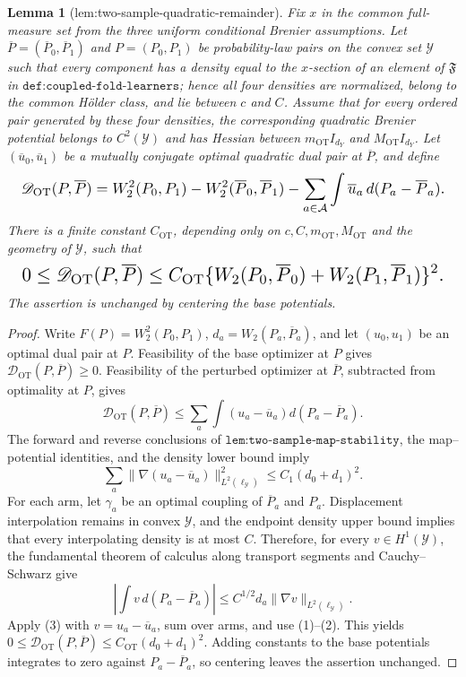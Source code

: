 \documentclass{article}
\newtheorem{lemma}{Lemma}
\begin{document}
\begin{lemma}[lem:two-sample-quadratic-remainder]\label{lem:two-sample-quadratic-remainder}
Fix \(x\) in the common full-measure set from the three uniform conditional Brenier assumptions. Let \(\overline P=(\overline P_0,\overline P_1)\) and \(P=(P_0,P_1)\) be probability-law pairs on the convex set \(\mathcal Y\) such that every component has a density equal to the \(x\)-section of an element of \(\mathfrak F\) in \(\texttt{def:coupled-fold-learners}\); hence all four densities are normalized, belong to the common H\"older class, and lie between \(c\) and \(C\). Assume that for every ordered pair generated by these four densities, the corresponding quadratic Brenier potential belongs to \(C^2(\mathcal Y)\) and has Hessian between \(m_{\mathrm{OT}}I_{d_Y}\) and \(M_{\mathrm{OT}}I_{d_Y}\). Let \((\overline u_0,\overline u_1)\) be a mutually conjugate optimal quadratic dual pair at \(\overline P\), and define
\[
\makebox[\linewidth][c]{\resizebox{0.98\linewidth}{!}{\(\displaystyle \mathscr D_{\mathrm{OT}}(P,\overline P)
=W_2^2(P_0,P_1)-W_2^2(\overline P_0,\overline P_1)
-\sum_{a\in\mathcal A}\int\overline u_a\,d(P_a-\overline P_a).\)}}
\]
There is a finite constant \(C_{\mathrm{OT}}\), depending only on \(c,C,m_{\mathrm{OT}},M_{\mathrm{OT}}\) and the geometry of \(\mathcal Y\), such that
\[
\makebox[\linewidth][c]{\resizebox{0.98\linewidth}{!}{\(\displaystyle 0\le\mathscr D_{\mathrm{OT}}(P,\overline P)
\le C_{\mathrm{OT}}\{W_2(P_0,\overline P_0)+W_2(P_1,\overline P_1)\}^2.\)}}
\]
The assertion is unchanged by centering the base potentials.
\end{lemma}
\begin{proof}
Write \(F(P)=W_2^2(P_0,P_1)\), \(d_a=W_2(P_a,\overline P_a)\), and let \((u_0,u_1)\) be an optimal dual pair at \(P\). Feasibility of the base optimizer at \(P\) gives \(\mathscr D_{\mathrm{OT}}(P,\overline P)\ge0\). Feasibility of the perturbed optimizer at \(\overline P\), subtracted from optimality at \(P\), gives
\[\mathscr D_{\mathrm{OT}}(P,\overline P)\le\sum_a\int(u_a-\overline u_a)d(P_a-\overline P_a).\tag{1}\]
The forward and reverse conclusions of \(\texttt{lem:two-sample-map-stability}\), the map--potential identities, and the density lower bound imply
\[\sum_a\lVert\nabla(u_a-\overline u_a)\rVert_{L^2(\ell_{\mathcal Y})}^2\le C_1(d_0+d_1)^2.\tag{2}\]
For each arm, let \(\gamma_a\) be an optimal coupling of \(\overline P_a\) and \(P_a\). Displacement interpolation remains in convex \(\mathcal Y\), and the endpoint density upper bound implies that every interpolating density is at most \(C\). Therefore, for every \(v\in H^1(\mathcal Y)\), the fundamental theorem of calculus along transport segments and Cauchy--Schwarz give
\[\left|\int v\,d(P_a-\overline P_a)\right|\le C^{1/2}d_a\lVert\nabla v\rVert_{L^2(\ell_{\mathcal Y})}.\tag{3}\]
Apply (3) with \(v=u_a-\overline u_a\), sum over arms, and use (1)--(2). This yields \(0\le\mathscr D_{\mathrm{OT}}(P,\overline P)\le C_{\mathrm{OT}}(d_0+d_1)^2\). Adding constants to the base potentials integrates to zero against \(P_a-\overline P_a\), so centering leaves the assertion unchanged.
\end{proof}
\end{document}
